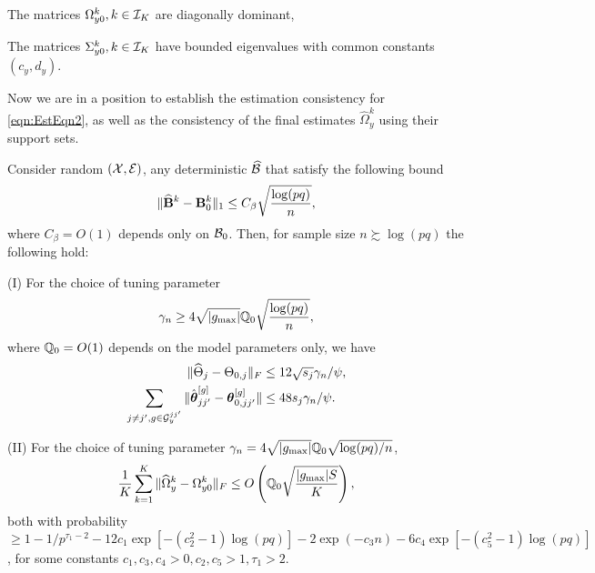 \vspace{1em}
 The matrices $\Omega_{y0}^k, k \in {\cal{I}}_K$ are diagonally dominant,

 The matrices $\Sigma_{y0}^k, k \in {\cal{I}}_K$ have bounded eigenvalues with common constants $(c_y, d_y)$.
\vspace{1em}
%

\noindent Now we are in a position to establish the estimation consistency for \eqref{eqn:EstEqn2}, as well as the consistency of the final estimates $\widehat \Omega_y^k$ using their support sets.

\begin{Theorem}\label{thm:thm-Theta}
Consider random $({\cal{X}}, {\cal{E}})$, any deterministic $\widehat {{\cal{B}}}$ that satisfy the following bound
%
$$
\| \widehat {{\mathbf{B}}}^k - {\mathbf{B}}_0^k \|_1 \leq C_\beta \sqrt{ \frac{ \log(pq)}{n}},
$$
%
where $C_\beta = O(1)$ depends only on ${\cal{B}}_0$. Then, for sample size $n \succsim \log (pq)$ the following hold:

\noindent (I) For the choice of tuning parameter
%
$$
\gamma_n \geq 4 \sqrt{| g_{\max}|} {\mathbb{Q}}_0 \sqrt {\frac{ \log (p q)}{n}},
$$
%
where ${\mathbb{Q}}_0 = O(1)$ depends on the model parameters only, we have
%
\begin{align}
\| \widehat \Theta_j - \Theta_{0,j} \|_F & \leq 12 \sqrt{s_j} \gamma_n / \psi, \label{eqn:theta-norm-bound-1}\\
\sum_{j \neq j', g \in {\cal{G}}_y^{jj'}} \| \hat {{\boldsymbol{\theta}}}_{jj'}^{[g]} - {\boldsymbol{\theta}}_{0,jj'}^{[g]} \| & \leq 48 s_j \gamma_n / \psi. \label{eqn:theta-norm-bound-2}
\end{align}
%

\noindent (II) For the choice of tuning parameter $\gamma_n = 4 \sqrt{| g_{\max}|} {\mathbb{Q}}_0 \sqrt{\log (p q)/n}$,
%
\begin{align}\label{eqn:OmegaBounds0}
\frac{1}{K} \sum_{k=1}^K \| \widehat \Omega_y^k - \Omega_{y0}^k \|_F \leq
O \left( {\mathbb{Q}}_0 \sqrt{\frac{| g_{\max}| S}{K}} \right),
\end{align}
%
both with probability $\geq 1 - 1/p^{\tau_1-2} - 12 c_1 \exp [-(c_2^2-1) \log(pq)] - 2 \exp (- c_3 n) - 6c_4 \exp [-(c_5^2-1) \log(pq)]$, for some constants $c_1, c_3, c_4 > 0, c_2, c_5 > 1, \tau_1 > 2$.
\end{Theorem}


